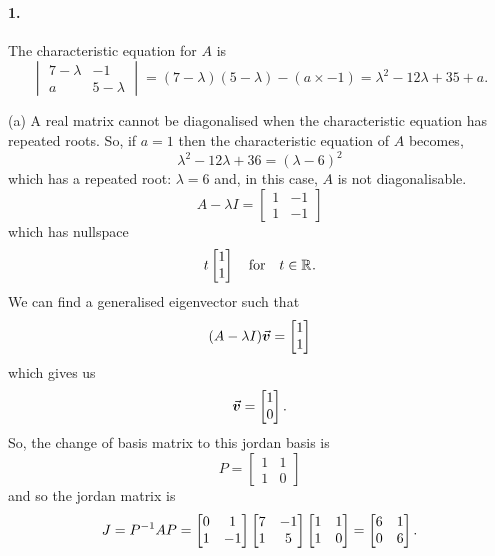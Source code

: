 \documentclass[../MathsNotesBase.tex]{subfiles}
\date{\vspace{-6ex}}
\begin{document}
	
	\paragraph{1.} The characteristic equation for $A$ is
	\[ 	\begin{vmatrix}
			7 - \lambda & -1\\
			a & 5 - \lambda
		\end{vmatrix} = (7 - \lambda)(5 - \lambda) - (a \times -1) = \lambda^2 - 12 \lambda + 35 + a. 
	\]
	
	\nl[8]
	(a) A real matrix cannot be diagonalised when the characteristic equation has repeated roots. So, if ${ a = 1 }$ then the characteristic equation of $A$ becomes,
	\[ \lambda^2 - 12 \lambda + 36 = (\lambda - 6)^2 \]
	which has a repeated root: ${ \lambda = 6 }$ and, in this case, $A$ is not diagonalisable.\\
	
	\[ A - \lambda I = 	\begin{bmatrix}
							1 & -1\\
							1 & -1
						\end{bmatrix}
	\]
	which has nullspace
	\[ t \begin{bmatrix}1\\1\end{bmatrix} \hspace{10pt}\text{for}\hspace{10pt} t \in \mathbb{R}^{}. \]
	We can find a generalised eigenvector such that 
	\[ (A - \lambda I) \vec{\bm{v}} = \begin{bmatrix}1\\1\end{bmatrix} \]
	which gives us
	\[ \vec{\bm{v}} = \begin{bmatrix}1\\0\end{bmatrix}. \]
	So, the change of basis matrix to this jordan basis is
	\[ P = 	\begin{bmatrix}
				1 & 1\\
				1 & 0
			\end{bmatrix} 
	\]
	and so the jordan matrix is
	\[ J = {P}^{-1}AP = 	\begin{bmatrix}
							0 & 1\\
							1 & -1
						\end{bmatrix}
						\begin{bmatrix}
							7 & -1\\
							1 & 5
						\end{bmatrix}
						\begin{bmatrix}
							1 & 1\\
							1 & 0
						\end{bmatrix} =
						\begin{bmatrix}
							6 & 1\\
							0 & 6
						\end{bmatrix}.				
	\]
	
\end{document}
